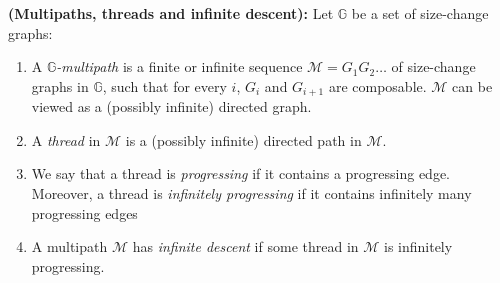 \documentclass{article}
\begin{document}
\begin{definition}
    \textbf{(Multipaths, threads and infinite descent):} Let $\mathbb{G}$ be a set of size-change graphs: 
    \begin{enumerate}
        \item A \emph{$\mathbb{G}$-multipath} is a finite or infinite sequence $\mathcal{M} = G_1G_2 \ldots$ of size-change graphs in $\mathbb{G}$, such that for every $i$, $G_i$ and $G_{i+1}$ are composable. $\mathcal{M}$ can be viewed as a (possibly infinite) directed graph.
        
        \item A \emph{thread} in $\mathcal{M}$ is a (possibly infinite) directed path in $\mathcal{M}$. 
        
        \item We say that a thread is \emph{progressing} if it contains a progressing edge. Moreover, a thread is \emph{infinitely progressing} if it contains infinitely many progressing edges
        
        \item A multipath $\mathcal{M}$ has {\em infinite descent} if some thread in $\mathcal{M}$ is infinitely progressing.
    \end{enumerate}  
\end{definition}
\end{document}
